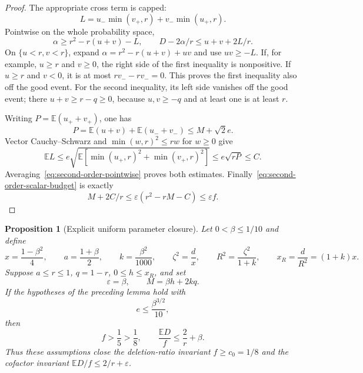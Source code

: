 \documentclass[11pt]{article}
\numberwithin{equation}{section}
\newtheorem{proposition}[theorem]{Proposition}
\begin{document}
\begin{proof}
The appropriate cross term is capped:
\[
 L=u_-\min(v_+,r)+v_-\min(u_+,r).
\]
Pointwise on the whole probability space,
\begin{equation}\label{eq:second-order-pointwise}
 \alpha\ge r^2-r(u+v)-L,
 \qquad D-2\alpha/r\le u+v+2L/r.
\end{equation}
On $\{u<r,v<r\}$, expand
$\alpha=r^2-r(u+v)+uv$ and use $uv\ge-L$.
If, for example, $u\ge r$ and $v\ge0$, the right side of
the first inequality is nonpositive. If $u\ge r$ and $v<0$,
it is at most $rv_- - rv_-=0$. This proves the first inequality
also off the good event. For the second inequality, its left
side vanishes off the good event; there $u+v\ge r-q\ge0$,
because $u,v\ge-q$ and at least one is at least $r$.

Writing $P=\mathbb E(u_++v_+)$, one has
\[
 P=\mathbb E(u+v)+\mathbb E(u_-+v_-)
 \le M+\sqrt2e.
\]
Vector Cauchy--Schwarz and $\min(w,r)^2\le rw$ for $w\ge0$
give
\[
 \mathbb E L
 \le e\sqrt{\mathbb E\left[\min(u_+,r)^2+
                         \min(v_+,r)^2\right]}
 \le e\sqrt{rP}\le C.
\]
Averaging~\eqref{eq:second-order-pointwise} proves both estimates.
Finally~\eqref{eq:second-order-scalar-budget} is exactly
\[
 M+2C/r\le\varepsilon(r^2-rM-C)\le\varepsilon f.
\]
\end{proof}

\begin{proposition}[Explicit uniform parameter closure]
Let $0<\beta\le1/10$ and define
\[
 x=\frac{1-\beta^2}{4},\qquad
 a=\frac{1+\beta}{2},\qquad
 k=\frac{\beta^2}{1000},\qquad
 \zeta^2=\frac d x,\qquad R^2=\frac{\zeta^2}{1+k},
 \qquad x_R=\frac d{R^2}=(1+k)x.
\]
Suppose $a\le r\le1$, $q=1-r$, $0\le h\le x_R$, and set
\[
 \varepsilon=\beta,\qquad M=\beta h+2kq.
\]
If the hypotheses of the preceding lemma hold with
\[
 e\le\frac{\beta^{3/2}}{10},
\]
then
\[
 f>\frac15>\frac18,
 \qquad \frac{\mathbb E D}{f}\le\frac2r+\beta.
\]
Thus these assumptions close the deletion-ratio invariant
$f\ge c_0=1/8$ and the cofactor invariant
$\mathbb E D/f\le2/r+\varepsilon$.
\end{proposition}
\end{document}
